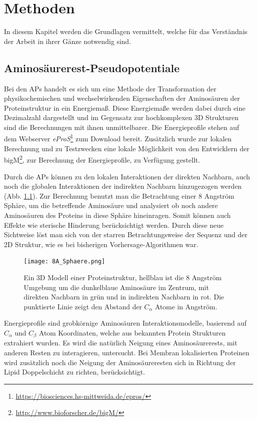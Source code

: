 \chapter{Methoden}

In diesem Kapitel werden die Grundlagen vermittelt, welche für das Verständnis der Arbeit in ihrer Gänze notwendig sind.

\section{Aminosäurerest-Pseudopotentiale}

Bei den \acf{APs} handelt es sich um eine Methode der Transformation der physikochemischen und wechselwirkenden Eigenschaften der Aminosäuren der Proteinstruktur in ein Energiemaß. Diese Energiemaße werden dabei durch eine Dezimalzahl dargestellt und im Gegensatz zur hochkomplexen 3D Strukturen sind die Berechnungen mit ihnen unmittelbarer. Die Energieprofile stehen auf dem Webserver \emph{eProS}\footnote{\url{https://biosciences.hs-mittweida.de/epros/}} zum Download bereit. Zusätzlich wurde zur lokalen Berechnung und zu Testzwecken eine lokale Möglichkeit von den Entwicklern der \ac{bigM}\footnote{\url{http://www.bioforscher.de/bigM/}}, zur Berechnung der Energieprofile, zu Verfügung gestellt.

Durch die \ac{APs} können zu den lokalen Interaktionen der direkten Nachbarn, auch noch die globalen Interaktionen der indirekten Nachbarn hinzugezogen werden (Abb. \ref{fig:8A_Sphaere}). Zur Berechnung benutzt man die Betrachtung einer 8 Angström Sphäre, um die betreffende Aminosäure und analysiert ob noch andere Aminosäuren des Proteins in diese Sphäre hineinragen. Somit können auch Effekte wie sterische Hinderung berücksichtigt werden. Durch diese neue Sichtweise löst man sich von der starren Betrachtungsweise der Sequenz und der 2D Struktur, wie es bei bisherigen Vorhersage-Algorithmen war.
%
\begin{figure}
\centering
\texttt{[image: 8A\_Sphaere.png]}
\caption{Ein 3D Modell einer Proteinstruktur, hellblau ist die 8 Angström Umgebung um die dunkelblaue Aminosäure im Zentrum, mit direkten Nachbarn in grün und in indirekten Nachbarn in rot. Die punktierte Linie zeigt den Abstand der $C_{\alpha}$ Atome in Angström.}%
\label{fig:8A_Sphaere}
\end{figure}

Energieprofile sind grobkörnige Aminosäuren Interaktionsmodelle, basierend auf $C_{\alpha}$ und $C_{\beta}$ Atom Koordinaten, welche aus bekannten Protein Strukturen extrahiert wurden. Es wird die natürlich Neigung eines Aminosäurerests, mit anderen Resten zu interagieren, untersucht. Bei Membran lokalisierten Proteinen wird zusätzlich noch die Neigung der Aminosäureresten sich in Richtung der Lipid Doppelschicht zu richten, berücksichtigt. 

